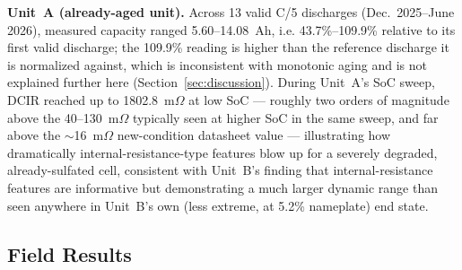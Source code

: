 \documentclass[conference]{IEEEtran}
\begin{document}
\textbf{Unit~A (already-aged unit).} Across 13 valid C/5 discharges (Dec.\ 2025--June 2026), measured capacity ranged 5.60--14.08~Ah, i.e. 43.7\%--109.9\% relative to its first valid discharge; the 109.9\% reading is higher than the reference discharge it is normalized against, which is inconsistent with monotonic aging and is not explained further here (Section~\ref{sec:discussion}). During Unit~A's SoC sweep, DCIR reached up to 1802.8~m$\Omega$ at low SoC --- roughly two orders of magnitude above the 40--130~m$\Omega$ typically seen at higher SoC in the same sweep, and far above the $\sim$16~m$\Omega$ new-condition datasheet value --- illustrating how dramatically internal-resistance-type features blow up for a severely degraded, already-sulfated cell, consistent with Unit~B's finding that internal-resistance features are informative but demonstrating a much larger dynamic range than seen anywhere in Unit~B's own (less extreme, at 5.2\% nameplate) end state.

\subsection{Field Results}
\label{sec:results-field}
\end{document}
